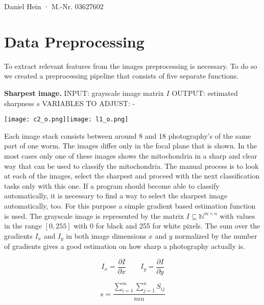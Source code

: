 \documentclass[a4paper, 11pt]{article}
\begin{document}
\begin{center}
	Daniel Hein · M.-Nr. 03627602
\end{center}

\section{Data Preprocessing}
To extract relevant features from the images preprocessing is necessary. To do so we created a preprocessing pipeline that consists of five separate functions.
\newline

\textbf{Sharpest image.} 
\newline
\newline
INPUT: grayscale image matrix $I$
\newline
OUTPUT: estimated sharpness $s$
\newline
VARIABLES TO ADJUST: -
\newline
\newline
\begin{center}\texttt{[image: c2\_o.png]}\texttt{[image: l1\_o.png]}
\end{center}
Each image stack consists between around 8 and 18 photography’s of the same part of one worm. The images differ only in the focal plane that is shown. In the most cases only one of these images shows the mitochondria in a sharp and clear way that can be used to classify the mitochondria. The manual process is to look at each of the images, select the sharpest and proceed with the next classification tasks only with this one. If a program should become able to classify automatically, it is necessary to find a way to select the sharpest image automatically, too. 
\newline
For this purpose a simple gradient based estimation function is used. The grayscale image is represented by the matrix $I\subseteq{\mathbb N}^{m \times n}$ with values in the range $[0,255]$ with 0 for black and 255 for white pixels. The sum over the gradients $I_x$ and $I_y$ in both image dimensions $x$ and $y$ normalized by the number of gradients gives a good estimation on how sharp a photography actually is. 

\begin{equation}
	I_x = \frac{\partial I}{\partial x} \qquad I_y = \frac{\partial I}{\partial y}
\end{equation}

\begin{equation}
	s = \frac{\sum_{i=1}^{m}\sum_{j=1}^{n}S_{ij}}{mn} 
\end{equation}
\end{document}
